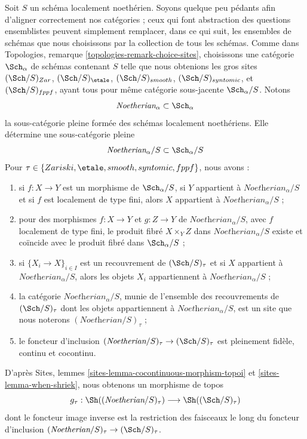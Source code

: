 \medskip\noindent
Soit $S$ un schéma localement noethérien. Soyons quelque peu pédants afin
d'aligner correctement nos catégories ; ceux qui font abstraction des
questions ensemblistes peuvent simplement remplacer, dans ce qui suit, les
ensembles de schémas que nous choisissons par la collection de tous les
schémas. Comme dans Topologies, remarque
\ref{topologies-remark-choice-sites}, choisissons une catégorie
$\Sch_\alpha$ de schémas contenant $S$ telle que nous obtenions les gros sites
$(\Sch/S)_{Zar}$,
$(\Sch/S)_\etale$, $(\Sch/S)_{smooth}$, $(\Sch/S)_{syntomic}$,
et $(\Sch/S)_{fppf}$, ayant tous pour même catégorie sous-jacente
$\Sch_\alpha/S$. Notons
$$
\textit{Noetherian}_\alpha \subset \Sch_\alpha
$$
la sous-catégorie pleine formée des schémas localement noethériens. Elle
détermine une sous-catégorie pleine
$$
\textit{Noetherian}_\alpha/S \subset \Sch_\alpha/S
$$
Pour $\tau \in \{Zariski, \etale, smooth, syntomic, fppf\}$, nous avons :
\begin{enumerate}
\item si $f : X \to Y$ est un morphisme de $\Sch_\alpha/S$, si $Y$ appartient
à $\textit{Noetherian}_\alpha/S$ et si $f$ est localement de type fini, alors
$X$ appartient à $\textit{Noetherian}_\alpha/S$ ;
\item pour des morphismes $f : X \to Y$ et $g : Z \to Y$ de
$\textit{Noetherian}_\alpha/S$, avec $f$ localement de type fini, le produit
fibré $X \times_Y Z$ dans $\textit{Noetherian}_\alpha/S$ existe et coïncide
avec le produit fibré dans $\Sch_\alpha/S$ ;
\item si $\{X_i \to X\}_{i \in I}$ est un recouvrement de
$(\Sch/S)_\tau$ et si $X$ appartient à $\textit{Noetherian}_\alpha/S$, alors
les objets $X_i$ appartiennent à $\textit{Noetherian}_\alpha/S$ ;
\item la catégorie $\textit{Noetherian}_\alpha/S$, munie de l'ensemble des
recouvrements de $(\Sch/S)_\tau$ dont les objets appartiennent à
$\textit{Noetherian}_\alpha/S$, est un site que nous noterons
$(\textit{Noetherian}/S)_\tau$ ;
\item le foncteur d'inclusion
$(\textit{Noetherian}/S)_\tau \to (\Sch/S)_\tau$
est pleinement fidèle, continu et cocontinu.
\end{enumerate}
D'après Sites, lemmes \ref{sites-lemma-cocontinuous-morphism-topoi} et
\ref{sites-lemma-when-shriek}, nous obtenons un morphisme de topos
$$
g_\tau : \Sh((\textit{Noetherian}/S)_\tau) \longrightarrow \Sh((\Sch/S)_\tau)
$$
dont le foncteur image inverse est la restriction des faisceaux le long du
foncteur d'inclusion
$(\textit{Noetherian}/S)_\tau \to (\Sch/S)_\tau$.

